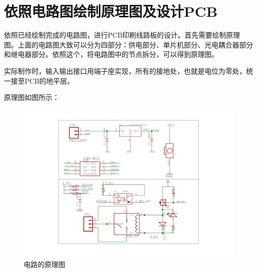 \section{依照电路图绘制原理图及设计PCB}

\setlength\parindent{2em} 依照已经绘制完成的电路图，进行PCB印刷线路板的设计。首先需要绘制原理图。上面的电路图大致可以分为四部分：供电部分、单片机部分、光电耦合器部分和继电器部分。依照这个，将电路图中的节点拆分，可以得到原理图。
\par 实际制作时，输入输出接口用端子座实现，所有的接地处，也就是电位为零处，统一接至PCB的地平层。
\par 原理图如图所示：
\begin{figure}[h!]
	\includegraphics[width=1.5\textwidth]{schematic}
	\caption[schematic]{电路的原理图}
\end{figure}